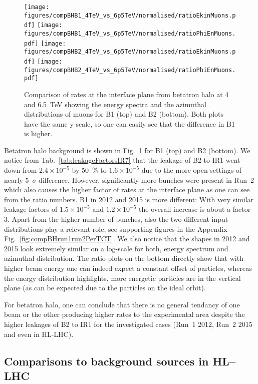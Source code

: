 \begin{figure}
\centering
  \texttt{[image: figures/compBHB1\_4TeV\_vs\_6p5TeV/normalised/ratioEkinMuons.pdf]}
  \texttt{[image: figures/compBHB1\_4TeV\_vs\_6p5TeV/normalised/ratioPhiEnMuons.pdf]}
  \texttt{[image: figures/compBHB2\_4TeV\_vs\_6p5TeV/normalised/ratioEkinMuons.pdf]}
  \texttt{[image: figures/compBHB2\_4TeV\_vs\_6p5TeV/normalised/ratioPhiEnMuons.pdf]}
 \caption{Comparison of rates at the interface plane from betatron halo at 4 and 6.5~TeV showing the energy spectra and the azimuthal distributions of muons for B1 (top) and B2 (bottom). Both plots have the same y-scale, so one can easily see that the difference in B1 is higher.
  \label{fig:compBHrun1run2}}
\end{figure}

Betatron halo background is shown in Fig.~\ref{fig:compBHrun1run2} for B1 (top) and B2 (bottom). We notice from Tab.~\ref{tab:leakageFactorsIR7} that the leakage of B2 to IR1 went down from $2.4 \times 10^{-5}$ by 50~\% to $1.6 \times 10^{-5}$ due to the more open settings of nearly 5~$\sigma$ difference. However, significantly more bunches were present in Run~2 which also causes the higher factor of rates at the interface plane as one can see from the ratio numbers. B1 in 2012 and 2015 is more different: With very similar leakage factors of $1.5 \times 10^{-5}$ and $1.2 \times 10^{-5}$ the overall increase is about a factor 3. Apart from the higher number of bunches, also the two different input distributions play a relevant role, see supporting figures in the Appendix Fig.~\ref{fig:compBHrun1run2PerTCT}. We also notice that the shapes in 2012 and 2015 look extremely similar on a log-scale for both, energy spectrum and azimuthal distribution. The ratio plots on the bottom directly show that with higher beam energy one can indeed expect a constant offset of particles, whereas the energy distribution highlights, more energetic particles are in the vertical plane (as can be expected due to the particles on the ideal orbit).

For betatron halo, one can conclude that there is no general tendancy of one beam or the other producing higher rates to the experimental area despite the higher leakages of B2 to IR1 for the investigated cases (Run~1 2012, Run~2 2015 and even in HL-LHC).

\subsection{Comparisons to background sources in HL--LHC}


